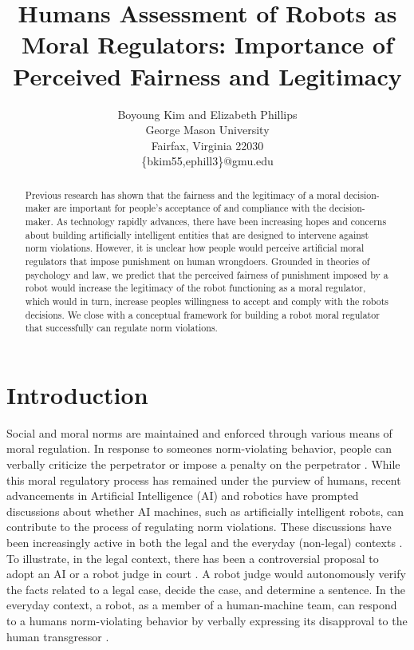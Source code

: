 \documentclass{article} %
\title{Humans Assessment of Robots as Moral Regulators: Importance of Perceived Fairness and Legitimacy}
\author{Boyoung Kim and Elizabeth Phillips\\
{\normalfont George Mason University\\
Fairfax, Virginia 22030\\
\{bkim55,ephill3\}@gmu.edu}}
\begin{document}
\maketitle

\begin{abstract}
Previous research has shown that the fairness and the legitimacy of a moral decision-maker are important for people's acceptance of and compliance with the decision-maker. As technology rapidly advances, there have been increasing hopes and concerns about building artificially intelligent entities that are designed to intervene against norm violations. However, it is unclear how people would perceive artificial moral regulators that impose punishment on human wrongdoers. Grounded in theories of psychology and law, we predict that the perceived fairness of punishment imposed by a robot would increase the legitimacy of the robot functioning as a moral regulator, which would in turn, increase peoples willingness to accept and comply with the robots decisions. We close with a conceptual framework for building a robot moral regulator that successfully can regulate norm violations. 
\end{abstract}

\section{Introduction}
Social and moral norms are maintained and enforced through various means of moral regulation. In response to someones norm-violating behavior, people can verbally criticize the perpetrator or impose a penalty on the perpetrator \cite{henrich2006costly}. While this moral regulatory process has remained under the purview of humans, recent advancements in Artificial Intelligence (AI) and robotics have prompted discussions about whether AI machines, such as artificially intelligent robots, can contribute to the process of regulating norm violations. These discussions have been increasingly active in both the legal \cite{branting1998automating,sartor1998introduction,sourdin2018judge} and the everyday (non-legal) contexts \cite{briggs2015sorry,jung2015using,jackson2019tact}. To illustrate, in the legal context, there has been a controversial proposal to adopt an AI or a robot judge in court \cite{ulenaers2020impact,chen2021having,casey2020will}. A robot judge would autonomously verify the facts related to a legal case, decide the case, and determine a sentence. In the everyday context, a robot, as a member of a human-machine team, can respond to a humans norm-violating behavior by verbally expressing its disapproval to the human transgressor \cite{briggs2015sorry,jung2015using,jackson2019tact}.
\end{document}
